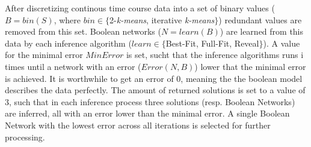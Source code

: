 After discretizing continous time course data into a set of binary values ($B=bin(S)$, where $bin\in \{ $2-\textit{k-means}, iterative \textit{k-means}$\}$) redundant values are removed from this set. Boolean networks ($N=learn(B)$) are learned from this data by each inference algorithm ($learn\in \{$Best-Fit, Full-Fit, Reveal$\}$). A value for the minimal error $MinError$ is set, sucht that the inference algorithms runs i times until a network with an error ($Error(N,B)$) lower that the minimal error is achieved. 
It is worthwhile to get an error of $0$, meaning the the boolean model describes the data perfectly. The amount of returned solutions is set to a value of $3$, such that in each inference process three solutions (resp. Boolean Networks) are inferred, all with an error lower than the minimal error. A single Boolean Network with the lowest error across all iterations is selected for further processing.
